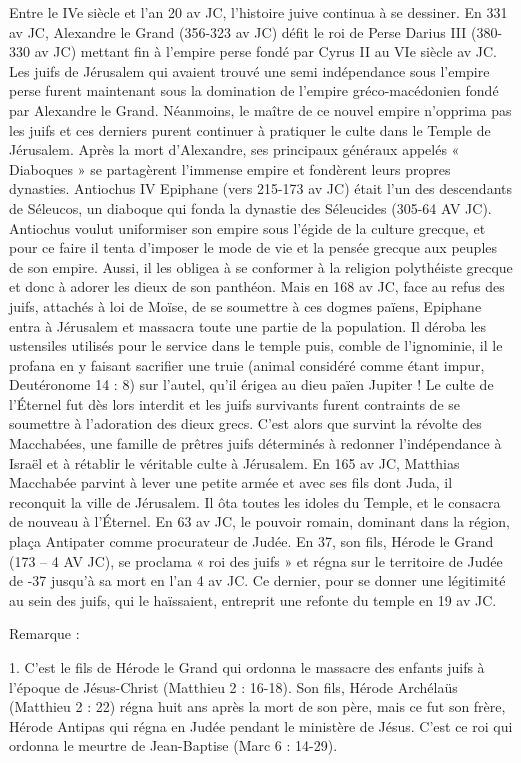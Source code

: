 Entre le IVe siècle et l'an 20 av JC, l'histoire juive continua à se dessiner.
En 331 av JC, Alexandre le Grand (356-323 av JC) défit le roi de Perse Darius III (380-330 av JC) mettant fin à l'empire perse fondé par Cyrus II au VIe siècle av JC. Les juifs de Jérusalem qui avaient trouvé une semi indépendance sous l'empire perse furent maintenant sous la domination de l'empire gréco-macédonien fondé par Alexandre le Grand. Néanmoins, le maître de ce nouvel empire n'opprima pas les juifs et ces derniers purent continuer à pratiquer le culte dans le Temple de Jérusalem. Après la mort d'Alexandre, ses principaux généraux appelés « Diaboques » se partagèrent l'immense empire et fondèrent leurs propres dynasties. Antiochus IV Epiphane (vers 215-173 av JC) était l'un des descendants de Séleucos, un diaboque qui fonda la dynastie des Séleucides (305-64 AV JC). Antiochus voulut uniformiser son empire sous l'égide de la culture grecque, et pour ce faire il tenta d'imposer le mode de vie et la pensée grecque aux peuples de son empire. Aussi, il les obligea à se conformer à la religion polythéiste grecque et donc à adorer les dieux de son panthéon. Mais en 168 av JC, face au refus des juifs, attachés à loi de Moïse, de se soumettre à ces dogmes païens, Epiphane entra à Jérusalem et massacra toute une partie de la population. Il déroba les ustensiles utilisés pour le service dans le temple puis, comble de l'ignominie, il le profana en y faisant sacrifier une truie (animal considéré comme étant impur, Deutéronome 14 : 8) sur l'autel, qu’il érigea au dieu païen Jupiter ! Le culte de l’Éternel fut dès lors interdit et les juifs survivants furent contraints de se soumettre à l'adoration des dieux grecs.
C'est alors que survint la révolte des Macchabées, une famille de prêtres juifs déterminés à redonner l'indépendance à Israël et à rétablir le véritable culte à Jérusalem. En 165 av JC, Matthias Macchabée parvint à lever une petite armée et avec ses fils dont Juda, il reconquit la ville de Jérusalem. Il ôta toutes les idoles du Temple, et le consacra de nouveau à l’Éternel.
En 63 av JC, le pouvoir romain, dominant dans la région, plaça Antipater comme procurateur de Judée. En 37, son fils, Hérode le Grand (173 – 4 AV JC), se proclama « roi des juifs » et régna sur le territoire de Judée de -37 jusqu'à sa mort en l'an 4 av JC. Ce dernier, pour se donner une légitimité au sein des juifs, qui le haïssaient, entreprit une refonte du temple en 19 av JC.

Remarque :

1. C'est le fils de Hérode le Grand qui ordonna le massacre des enfants juifs à l'époque de Jésus-Christ (Matthieu 2 : 16-18). Son fils, Hérode Archélaüs (Matthieu 2 : 22) régna huit ans après la mort de son père, mais ce fut son frère, Hérode Antipas qui régna en Judée pendant le ministère de Jésus. C'est ce roi qui ordonna le meurtre de Jean-Baptise (Marc 6 : 14-29).

